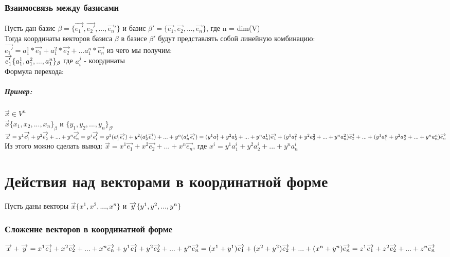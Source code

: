 \documentclass{book}
\begin{document}
\subsection{Взаимосвязь между базисами}
Пусть дан базис $\beta=\{\overrightarrow{e_1'},\overrightarrow{e_2'},...,\overrightarrow{e_n}'\}$ и базис $\beta'=\{\overrightarrow{e_1},\overrightarrow{e_2},...,\overrightarrow{e_n}\}$, где n = dim(V)\\
Тогда координаты векторов базиса $\beta$ в базисе $\beta'$ будут представлять собой линейную комбинацию: \\
$\overrightarrow{e_1'}=a_1^1*\overrightarrow{e_1}+a_1^2*\overrightarrow{e_2}+...a_1^n*\overrightarrow{e_n}$ из чего мы получим:\\
$\overrightarrow{e_1'}\{a_1^1,a_1^2,...,a_1^n\}_\beta\\$
где $a^j_i$ - координаты\\
Формула перехода:
\paragraph*{Пример:}
$\overrightarrow{x} \in V^n$\\
$\overrightarrow{x}\{x_1,x_2,...,x_n\}_\beta$ и $\{y_1,y_2,...,y_n\}_{\beta'}$\\
$\overrightarrow{x}=y^1\overrightarrow{e_1'}+y^2\overrightarrow{e_2'}+...+y^n\overrightarrow{e_n'}=y^j\overrightarrow{e_i'}=y^1(a^i_1\overrightarrow{e_i})+y^2(a^i_2\overrightarrow{e_i})+...+y^n(a^i_n\overrightarrow{e_i})=(y^1a_1^1+y^2a_2^1+...+y^{n}a^1_n)\overrightarrow{e_1}+(y^1a_1^2+y^2a_2^2+...+y^{n}a^2_n)\overrightarrow{e_2}+...+(y^1a_1^n+y^2a_2^n+...+y^{n}a^n_n)\overrightarrow{e_n}\\$
Из этого можно сделать вывод:
$\overrightarrow{x}=x^1\overrightarrow{e_1}+x^2\overrightarrow{e_2}+...+x^n\overrightarrow{e_n}$, где $x^i=y^1a_1^i+y^2a_2^i+...+y^{n}a^i_n$

\chapter{Действия над векторами в координатной форме}
Пусть даны векторы $\overrightarrow{x}\{x^1,x^2,...,x^n\}$ и $\overrightarrow{y}\{y^1,y^2,...,y^n\}\\$
\subsection{Сложение векторов в координатной форме}
$\overrightarrow{x}+\overrightarrow{y}=x^1\overrightarrow{e_1}+x^2\overrightarrow{e_2}+...+x^n\overrightarrow{e_n}+y^1\overrightarrow{e_1}+y^2\overrightarrow{e_2}+...+y^n\overrightarrow{e_n}=(x^1+y^1)\overrightarrow{e_1}+(x^2+y^2)\overrightarrow{e_2}+...+(x^n+y^n)\overrightarrow{e_n}=z^1\overrightarrow{e_1}+z^2\overrightarrow{e_2}+...+z^n\overrightarrow{e_n}\\$
\end{document}
